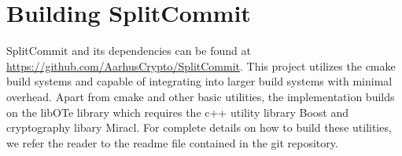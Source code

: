 \section{Building SplitCommit}

SplitCommit and its dependencies can be found at \url{https://github.com/AarhusCrypto/SplitCommit}. This project utilizes the cmake build systems and capable of integrating into larger build systems with minimal overhead. Apart from cmake and other basic utilities, the implementation builds on the libOTe\cite{libOTe} library which requires the c++ utility library Boost and cryptography libary Miracl. For complete details on how to build these utilities, we refer the reader to the readme file contained in the git repository.

